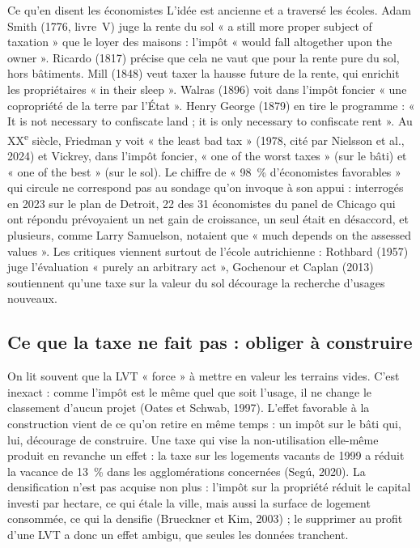 \documentclass[11pt,a4paper]{article}
\begin{document}
\begin{encadre}{Ce qu'en disent les économistes}
L'idée est ancienne et a traversé les écoles. Adam Smith (1776, livre~V) juge la rente du sol
« a still more proper subject of taxation » que le loyer des maisons : l'impôt « would fall
altogether upon the owner ». Ricardo (1817) précise que cela ne vaut que pour la rente pure du sol, hors
bâtiments. Mill (1848) veut taxer la hausse future de la rente, qui enrichit les propriétaires
« in their sleep ».
Walras (1896) voit dans l'impôt foncier « une copropriété de la terre par l'État ». Henry George (1879) en tire le programme : « It is not necessary to
confiscate land ; it is only necessary to confiscate rent ». Au XX\textsuperscript{e} siècle,
Friedman y voit « the least bad tax » (1978, cité par Nielsson et al., 2024) et Vickrey, dans
l'impôt foncier, « one of the worst taxes » (sur le bâti) et « one of the best » (sur le sol).
Le chiffre de « 98~\% d'économistes favorables » qui circule ne correspond pas au sondage
qu'on invoque à son appui : interrogés en 2023 sur le plan de Detroit, 22 des 31 économistes du panel de
Chicago qui ont répondu prévoyaient un net gain de croissance, un seul était en désaccord, et
plusieurs, comme Larry Samuelson, notaient que « much depends on the assessed values ». Les
critiques viennent surtout de l'école autrichienne : Rothbard (1957) juge l'évaluation
« purely an arbitrary act », Gochenour et Caplan (2013) soutiennent qu'une taxe sur la valeur
du sol décourage la recherche d'usages nouveaux.
\end{encadre}

\subsection{Ce que la taxe ne fait pas : obliger à construire}

On lit souvent que la LVT « force » à mettre en valeur les terrains vides. C'est inexact : comme
l'impôt est le même quel que soit l'usage, il ne change le classement d'aucun projet (Oates et
Schwab, 1997). L'effet favorable à la construction vient de ce qu'on retire en même temps : un
impôt sur le bâti qui, lui, décourage de construire. Une taxe qui vise la non-utilisation
elle-même produit en revanche un effet : la taxe sur les logements vacants de 1999 a réduit la
vacance de 13~\% dans les agglomérations concernées (Segú, 2020). La densification n'est pas acquise non plus :
l'impôt sur la propriété réduit le capital investi par hectare, ce qui étale la ville, mais aussi la
surface de logement consommée, ce qui la densifie (Brueckner et Kim, 2003) ; le supprimer au profit
d'une LVT a donc un effet ambigu, que seules les données tranchent.
\end{document}
